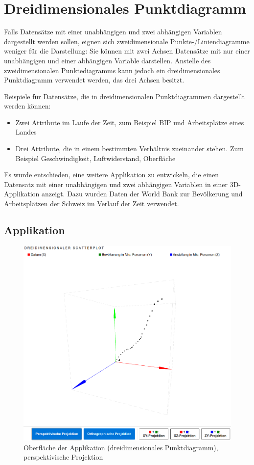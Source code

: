 \section{Dreidimensionales Punktdiagramm}

Falls Datensätze mit einer unabhängigen und zwei abhängigen Variablen dargestellt werden sollen, eignen sich zweidimensionale Punkte-/Liniendiagramme weniger für die Darstellung: Sie können mit zwei Achsen Datensätze mit nur einer unabhängigen und einer abhängigen Variable darstellen. Anstelle des zweidimensionalen Punktediagramms kann jedoch ein dreidimensionales Punktdiagramm verwendet werden, das drei Achsen besitzt.

Beispiele für Datensätze, die in dreidimensionalen Punktdiagrammen dargestellt werden können:

\begin{itemize}
	\item Zwei Attribute im Laufe der Zeit, zum Beispiel BIP und Arbeitsplätze eines Landes
	\item Drei Attribute, die in einem bestimmten Verhältnis zueinander stehen. Zum Beispiel Geschwindigkeit, Luftwiderstand, Oberfläche
\end{itemize}

Es wurde entschieden, eine weitere Applikation zu entwickeln, die einen Datensatz mit einer unabhängigen und zwei abhängigen Variablen in einer 3D-Applikation anzeigt. Dazu wurden Daten der World Bank \cite{worldbank} zur Bevölkerung und Arbeitsplätzen der Schweiz im Verlauf der Zeit verwendet.

\subsection{Applikation}

\begin{figure}[H]
	\centering
	\includegraphics[width=\linewidth]{images/3d}
	\caption{Oberfläche der Applikation (dreidimensionales Punktdiagramm), perspektivische Projektion}
	\label{fig:3d}
\end{figure}

